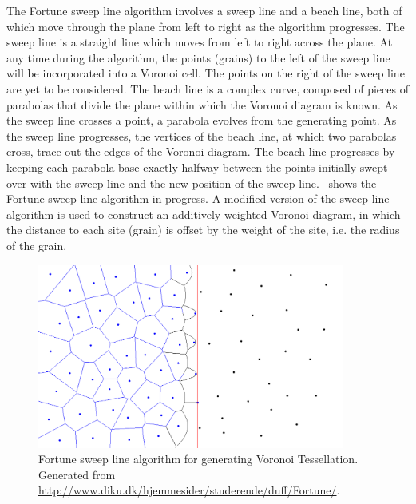 The Fortune sweep line algorithm involves a sweep line and a beach line, both 
of which move through the plane from left to right as the algorithm progresses. 
The sweep line is a straight line which moves from left to right across the 
plane. At any time during the algorithm, the points (grains) to the left of the 
sweep line will be incorporated into a Voronoi cell. The points on the 
right of the sweep line are yet to be considered. The beach line is a complex 
curve, composed of pieces of parabolas that divide the plane within which the 
Voronoi diagram is known. As the sweep line crosses a point, a parabola 
evolves from the generating point. As the sweep line progresses, the 
vertices of the beach line, at which two parabolas cross, trace out the edges 
of the Voronoi diagram. The beach line progresses by keeping each parabola base 
exactly halfway between the points initially swept over with the sweep line 
and the new position of the sweep line.~ shows the Fortune 
sweep line algorithm in progress. A modified version of 
the sweep-line algorithm is used to construct an additively weighted Voronoi 
diagram, in which the distance to each site (grain) is offset by the weight of 
the site, i.e. the radius of the grain.

\begin{figure}[tbhp]
\centering
\includegraphics[width=0.9\textwidth]{sweep_voro}
\caption[Fortune sweep line algorithm for generating Voronoi 
Tessellation.]{Fortune sweep line algorithm for generating Voronoi Tessellation. 
Generated from \url{http://www.diku.dk/hjemmesider/studerende/duff/Fortune/}.}
\label{fig:sweep_voro}
\end{figure}

